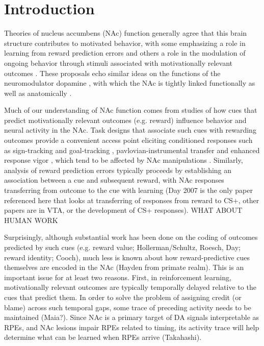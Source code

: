 \documentclass[11pt]{article}
\let\cite=\citep
\begin{document}
\section*{Introduction}

Theories of nucleus accumbens (NAc) function generally agree that this brain structure contributes to motivated behavior, with some emphasizing a role in learning from reward prediction errors \cite{Averbeck2017,Joel2002,Khamassi2012,Lee2012,Maia2009,Schultz2016}\cite[see also the addiction literature on effects of drug rewards;][]{Carelli2009,Hyman2006,Kalivas2005}  and others a role in the modulation of ongoing behavior through stimuli associated with motivationally relevant outcomes \cite[invigorating, directing;][]{Floresco2015,Nicola2010a,Salamone2012}. These proposals echo similar ideas on the functions of the neuromodulator dopamine \cite{Berridge2012,Maia2009,Salamone2012,Schultz2016}, with which the NAc is tightly linked functionally as well as anatomically \cite{Cheer2007,DuHoffmann2014,Ikemoto2007,Takahashi2016}.

Much of our understanding of NAc function comes from studies of how cues that predict motivationally relevant outcomes (e.g. reward) influence behavior and neural activity in the NAc. Task designs that associate such cues with rewarding outcomes provide a convenient access point eliciting conditioned responses such as sign-tracking and goal-tracking \cite{hearst1974sign,Robinson2009}, pavlovian-instrumental transfer \cite{Estes1943,Rescorla1967} and enhanced response vigor \cite{Nicola2010a,Niv2007}, which tend to be affected by NAc manipulations \cite{Chang2012,Corbit2011,Flagel2011} \cite[although not always straightforwardly (is Hauber appropriate?);][]{Chang2013,Hauber2000}. Similarly, analysis of reward prediction errors typically proceeds by establishing an association between a cue and subsequent reward, with NAc responses transferring from outcome to the cue with learning \cite{Day2007a,Roitman2005,Setlow2003,Schultz1997}(Day 2007 is the only paper referenced here that looks at transferring of responses from reward to CS+, other papers are in VTA, or the development of CS+ responses). WHAT ABOUT HUMAN WORK

Surprisingly, although substantial work has been done on the coding of outcomes predicted by such cues (e.g. reward value; Hollerman/Schultz, Roesch, Day; reward identity; Cooch), much less is known about how reward-predictive cues themselves are encoded in the NAc (Hayden from primate realm). This is an important issue for at least two reasons. First, in reinforcement learning, motivationally relevant outcomes are typically temporally delayed relative to the cues that predict them. In order to solve the problem of assigning credit (or blame) across such temporal gaps, some trace of preceding activity needs to be maintained \cite{Lee2012} (Maia?). Since NAc is a primary target of DA signals interpretable as RPEs, and NAc lesions impair RPEs related to timing, its activity trace will help determine what can be learned when RPEs arrive (Takahashi).
\end{document}
